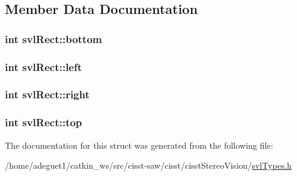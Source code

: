 \subsection{Member Data Documentation}
\hypertarget{structsvl_rect_abebdb3b96af5a98d7a952b6a441f7e89}{
\subsubsection[{bottom}]{\setlength{\rightskip}{0pt plus 5cm}int svl\-Rect\-::bottom}}\label{structsvl_rect_abebdb3b96af5a98d7a952b6a441f7e89}
\hypertarget{structsvl_rect_aee6c8420a1d44587061ddc2301ce7126}{
\subsubsection[{left}]{\setlength{\rightskip}{0pt plus 5cm}int svl\-Rect\-::left}}\label{structsvl_rect_aee6c8420a1d44587061ddc2301ce7126}
\hypertarget{structsvl_rect_a277323d99bd51d332973e9f4c94ef081}{
\subsubsection[{right}]{\setlength{\rightskip}{0pt plus 5cm}int svl\-Rect\-::right}}\label{structsvl_rect_a277323d99bd51d332973e9f4c94ef081}
\hypertarget{structsvl_rect_a66ceb775b0be45ce2d4229208e1bb210}{
\subsubsection[{top}]{\setlength{\rightskip}{0pt plus 5cm}int svl\-Rect\-::top}}\label{structsvl_rect_a66ceb775b0be45ce2d4229208e1bb210}


The documentation for this struct was generated from the following file\-:\begin{DoxyCompactItemize}
\item 
/home/adeguet1/catkin\-\_\-ws/src/cisst-\/saw/cisst/cisst\-Stereo\-Vision/\hyperlink{svl_types_8h}{svl\-Types.\-h}\end{DoxyCompactItemize}
